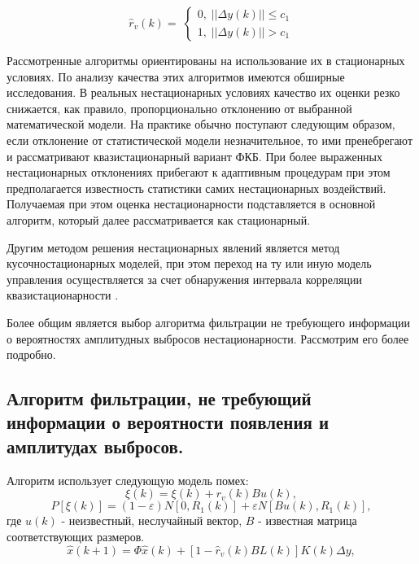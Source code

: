 \begin{equation}
\hat{r}_v(k)= \;
\begin{cases}
0, \; ||\Delta y(k)||\leq c_1 \\    
1, \; ||\Delta y(k)||> c_1    
\end{cases}
\end{equation}

Рассмотренные алгоритмы ориентированы на использование их в стационарных условиях. По анализу качества этих алгоритмов имеются обширные исследования\cite{Klekis,huber,tihonov}. 
В реальных нестационарных условиях качество их оценки резко снижается, как правило, пропорционально отклонению от выбранной математической модели.
На практике обычно поступают следующим образом, если отклонение от статистической модели незначительное, то ими пренебрегают и рассматривают квазистационарный вариант ФКБ. 
При более выраженных нестационарных отклонениях прибегают к адаптивным процедурам \cite{tihonov,popovski}
при этом предполагается известность статистики самих нестационарных воздействий.
Получаемая при этом оценка нестационарности подставляется в основной алгоритм, который далее рассматривается как стационарный.

Другим методом решения нестационарных явлений является метод кусочностационарных моделей, при этом переход на ту или иную модель управления осуществляется за счет обнаружения интервала корреляции квазистационарности \cite{tihonov}.

Более общим является выбор алгоритма фильтрации не требующего информации о вероятностях амплитудных выбросов нестационарности.
Рассмотрим его более подробно.

\subsection{Алгоритм фильтрации, не требующий информации о вероятности появления и амплитудах выбросов.} Алгоритм использует следующую модель помех:
\begin{equation}\label{eq3:optim5_01}
\xi(k)=\xi(k)+r_v(k)Bu(k),
\end{equation}
\begin{equation}\label{eq3:optim5_02}
P[\xi(k)]=(1-\varepsilon)N[0,R_1(k)]+\varepsilon N[Bu(k),R_1(k)],
\end{equation}
\noindent где $u(k)$ - неизвестный, неслучайный вектор, $B$ - известная матрица соответствующих размеров.
\begin{equation}\label{eq3:optim5}
\hat{x}(k+1)=\Phi\hat{x}(k)+[1-\hat{r}_v(k)BL(k)]K(k)\Delta y,
\end{equation}

